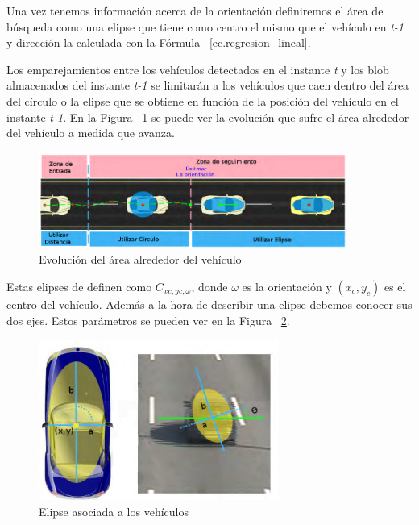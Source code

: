 Una vez tenemos información acerca de la orientación definiremos el área de búsqueda como una elipse que tiene como centro el mismo que el vehículo en \textit{t-1} y dirección la calculada con la Fórmula ~\ref{ec.regresion_lineal}.

Los emparejamientos entre los vehículos detectados en el instante \textit{t} y los blob almacenados del instante \textit{t-1} se limitarán a los vehículos que caen dentro del área del círculo o la elipse que se obtiene en función de la posición del vehículo en el instante \textit{t-1}. En la Figura ~\ref{fig.area_vehiculo} se puede ver la evolución que sufre el área alrededor del vehículo a medida que avanza.

 \begin{figure}[H] 
\begin{center}
	\includegraphics[width=0.9\textwidth]{figures/Diseno_global/areas_vehiculo.png}
   \caption{Evolución del área alrededor del vehículo}
	\label{fig.area_vehiculo}
\end{center}
\end{figure}


Estas elipses de definen como $C_{xc,yc,\omega}$, donde $\omega$ es la orientación y $(x_c, y_c)$ es el centro del vehículo. Además a la hora de describir una elipse debemos conocer sus dos ejes. Estos parámetros se pueden ver en la Figura ~\ref{fig.elipse}.

 \begin{figure}[H] 
\begin{center}
    \includegraphics[width=0.7\textwidth]{figures/Diseno_global/elipse.png}
   \caption{Elipse asociada a los vehículos}
	\label{fig.elipse}
\end{center}
\end{figure}

